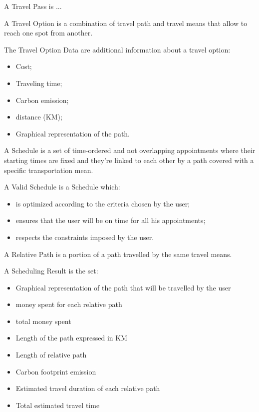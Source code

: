 \begin{definition}
A Travel Pass is  ...
\end{definition}

\begin{definition}
A Travel Option is a combination of travel path and travel means that allow to reach one spot from another.
\end{definition}

\begin{definition}
The Travel Option Data are additional information about a travel option:
\begin{itemize}
\item Cost;
\item Traveling time;
\item Carbon emission;
\item distance (KM);
\item Graphical representation of the path.

\end{itemize}
\end{definition}

\begin{definition}
A Schedule is a set of time-ordered and not overlapping appointments where their starting times are fixed and they're linked to each other by a path covered with a specific transportation mean.
\end{definition}

\begin{definition}
A Valid Schedule is a Schedule which:
\begin{itemize}
\item is optimized according to the criteria chosen by the user;
\item ensures that the user will be on time for all his appointments;
\item respects the constraints imposed by the user.
\end{itemize}
\end{definition}


\begin{definition}
A Relative Path is a  portion of a path travelled by the same travel means.
\end{definition}
 

\begin{definition}
A Scheduling Result is the set:
\begin{itemize}
\item Graphical representation of the path that will be travelled by the user
\item money spent for each relative path
\item total money spent 
\item Length of the path expressed in KM
\item Length of relative path 
\item Carbon footprint emission
\item Estimated travel duration of each relative path
\item Total estimated travel time
\end{itemize}
\end{definition}

